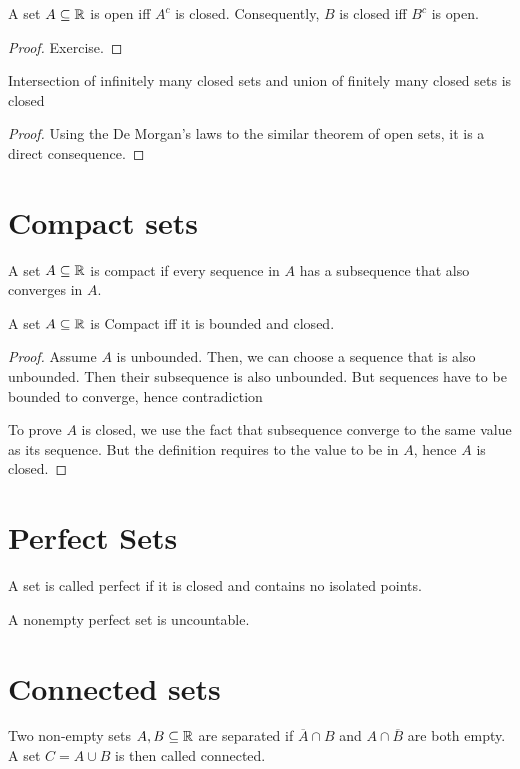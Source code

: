 \begin{theorem}
    A set $A \subseteq {\mathbb{R}}$ is open iff $A^c$ is closed. Consequently, $B$ is closed iff $B^c$ is open.
    \begin{proof} Exercise.
    \end{proof}
\end{theorem}
\begin{theorem} Intersection of infinitely many closed sets and union of finitely many closed sets is closed
    \begin{proof} Using the De Morgan's laws to the similar theorem of open sets, it is a direct consequence.
    \end{proof}
\end{theorem}
\section{Compact sets}
\begin{definition}
    A set $A \subseteq {\mathbb{R}}$ is compact if every sequence in $A$ has a subsequence that also converges in $A$.
\end{definition}
\begin{theorem}
    A set $A \subseteq {\mathbb{R}}$ is Compact iff it is bounded and closed.
    \begin{proof}
        Assume $A$ is unbounded. Then, we can choose a sequence that is also unbounded. Then their subsequence is also unbounded. But sequences have to be bounded to converge, hence contradiction

        To prove $A$ is closed, we use the fact that subsequence converge to the same value as its sequence. But the definition requires to the value to be in $A$, hence $A$ is closed.
    \end{proof}
\end{theorem}
\section{Perfect Sets}
\begin{definition}
    A set is called perfect if it is closed and contains no isolated points.
\end{definition}
\begin{theorem} A nonempty perfect set is uncountable.
\end{theorem}
\section{Connected sets}
\begin{definition}
    Two non-empty sets $A,B \subseteq {\mathbb{R}}$ are  separated if $\overline{A} \cap B$ and $A \cap \overline{B}$ are both empty. A set $C = A \cup B$ is  then called connected.
\end{definition}
